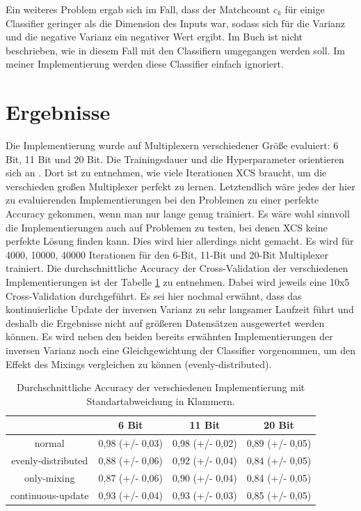 \documentclass[10pt]{ocsmnar}
\begin{document}
Ein weiteres Problem ergab sich im Fall, dass der Matchcount $c_k$ für einige Classifier geringer als die Dimension des Inputs war, sodass sich für die Varianz und die negative Varianz ein negativer Wert ergibt. Im Buch ist nicht beschrieben, wie in diesem Fall mit den Classifiern umgegangen werden soll. Im meiner Implementierung werden diese Classifier einfach ignoriert. 



\section{Ergebnisse}
Die Implementierung wurde auf Multiplexern verschiedener Größe evaluiert: 6 Bit, 11 Bit und 20 Bit. Die Trainingsdauer und die Hyperparameter orientieren sich an \cite{iqbal13}. Dort ist zu entnehmen, wie viele Iterationen XCS braucht, um die verschieden großen Multiplexer perfekt zu lernen. Letztendlich wäre jedes der hier zu evaluierenden Implementierungen bei den Problemen zu einer perfekte Accuracy gekommen, wenn man nur lange genug trainiert. Es wäre wohl sinnvoll die Implementierungen auch auf Problemen zu testen, bei denen XCS keine perfekte Lösung finden kann. Dies wird hier allerdings nicht gemacht. 
Es wird für 4000, 10000, 40000 Iterationen für den 6-Bit, 11-Bit und 20-Bit Multiplexer trainiert. 
Die durchschnittliche Accuracy der Cross\--Vali\-dation der verschiedenen Implementierungen ist der Tabelle \ref{accuracy-tabelle}
 zu entnehmen. Dabei wird jeweils eine 10x5 Cross-Va\-li\-da\-tion durchgeführt. Es sei hier nochmal erwähnt, dass das kontinuierliche Update der inversen Varianz zu sehr langsamer Laufzeit führt und deshalb die Ergebnisse nicht auf größeren Datensätzen ausgewertet werden können. 
Es wird neben den beiden bereits erwähnten Implementierungen der inversen Varianz noch eine Gleichgewichtung der Classifier vorgenommen, um den Effekt des Mixings vergleichen zu können (evenly-distributed).  

\begin{table}
    
\begin{center}\label{accuracy-tabelle}
\begin{tabular}{|c|c|c|c|}
    \hline
    & 6 Bit & 11 Bit & 20 Bit \\
    \hline
    normal & 0,98 (+/- 0,03) & 0,98 (+/- 0,02) & 0,89 (+/- 0,05) \\
    \hline
    evenly-distributed & 0,88 (+/- 0,06) & 0,92 (+/- 0,04) & 0,84 (+/- 0,05) \\
    \hline
    only-mixing & 0,87 (+/- 0,06) & 0,90 (+/- 0,04) & 0,84 (+/- 0,05) \\
    \hline
    continuous-update & 0,93 (+/- 0,04) & 0,93 (+/- 0,03) & 0,85 (+/- 0,05) \\
    \hline
\end{tabular}
\end{center}
\caption{Durchschnittliche Accuracy der verschiedenen Implementierung mit Standartabweichung in Klammern. }\label{accuracy-tabelle}
\end{table}
\end{document}
